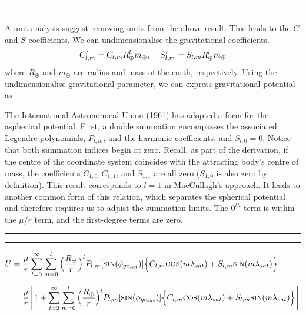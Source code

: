 \vspace{\belowdisplayskip}\hspace{9.2cm}
\rule[-6pt]{0.4pt}{6.4pt}%
\rule{\dimexpr(0.5\columnsep-0.4pt)}{0.4pt}%
\begin{multicols}{2}
A unit analysis suggest removing units from the above result. This leads to the $C$ and $S$ coefficients. We can undimensionalise the gravitational coefficients.
\begin{gather}
    C'_{l,m} = C_{l,m}R^l_\oplus m_\oplus,\hspace*{0.4cm}S'_{l,m} = S_{l,m}R^l_\oplus m_\oplus
\end{gather}
where $R_\oplus$ and $m_\oplus$ are radius and mass of the earth, respectively. Using the undimensionalise gravitational parameter, we can express gravitational potential as

\end{multicols}


\begin{multicols}{2}
The International Astronomical Union (1961) has adopted a form for the aspherical potential. First, a double summation encompasses the associated Legendre polynomials, $P_{l,m}$, and the harmonic coefficients, and $S_{l,0}=0$. Notice that both summation indices begin at zero. Recall, as part of the derivation, if the centre of the coordinate system coincides with the attracting body's centre of mass, the coefficients $C_{1,0},C_{1,1}$, and $S_{1,1}$ are all zero ($S_{1,0}$ is also zero by definition). This result corresponds to $l=1$ in MacCullagh's approach. It leads to another common form of this relation, which separates the spherical potential and therefore requires us to adjust the summation limits. The $0^{th}$ term is within the $\mu/r$ term, and the first-degree terms are zero.
\end{multicols}
\noindent\rule{\dimexpr(0.5\columnsep-0.4pt)}{0.4pt}%
\rule{0.4pt}{6pt}

\begin{gather}
    \begin{split}
        U &= \frac{\mu}{r}\sum_{l=0}^{\infty}\sum_{m=0}^{l}\Big(\frac{R_\oplus}{r}\Big)^lP_{l,m}[\text{\footnotesize{SIN}}(\phi_{gc_{sat}})]\Big\{C_{l,m}\text{\footnotesize{COS}}(m\lambda_{sat})+S_{l,m}\text{\footnotesize{SIN}}(m\lambda_{sat})\Big\}\\[0.2cm]
          &= \frac{\mu}{r}\Bigg[1+\sum_{l=2}^{\infty}\sum_{m=0}^{l}\Big(\frac{R_\oplus}{r}\Big)^lP_{l,m}[\text{\footnotesize{SIN}}(\phi_{gc_{sat}})]\Big\{C_{l,m}\text{\footnotesize{COS}}(m\lambda_{sat})+S_{l,m}\text{\footnotesize{SIN}}(m\lambda_{sat})\Big\}\Bigg]
    \end{split}
    \label{eq:final_potential}
\end{gather}


